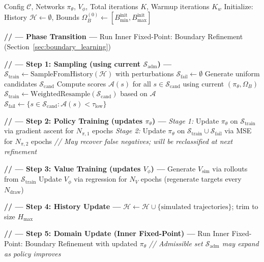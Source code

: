 \begin{algorithm}[H]
\caption{Deep Ramsey Algorithm with Two-Level Fixed-Point Iteration}
\label{alg:main}
\begin{algorithmic}[1]
\Require Config $\mathcal{C}$, Networks $\pi_\theta$, $V_\phi$, Total iterations $K$, Warmup iterations $K_w$
\State Initialize: History $\mathcal{H} \gets \emptyset$, Bounds $\Omega_B^{(0)} \gets [B_{\min}^{\text{init}}, B_{\max}^{\text{init}}]$

 
    \State \textbf{// --- Phase Transition ---}
        \State Run Inner Fixed-Point: Boundary Refinement (Section~\ref{sec:boundary_learning})
    \EndIf
    
    \State
    \State \textbf{// --- Step 1: Sampling (using current $\mathcal{S}_{\text{adm}}$) ---}
     
        \State $\mathcal{S}_{\text{train}} \gets \text{SampleFromHistory}(\mathcal{H})$ with perturbations
        \State $\mathcal{S}_{\text{fail}} \gets \emptyset$
    \Else {}
        \State Generate uniform candidates $\mathcal{S}_{\text{cand}}$
        \State Compute scores $\mathcal{A}(s)$ for all $s \in \mathcal{S}_{\text{cand}}$ using current $(\pi_\theta, \Omega_B)$
        \State $\mathcal{S}_{\text{train}} \gets \text{WeightedResample}(\mathcal{S}_{\text{cand}})$ based on $\mathcal{A}$
        \State $\mathcal{S}_{\text{fail}} \gets \{s \in \mathcal{S}_{\text{cand}} : \mathcal{A}(s) < \tau_{\text{low}}\}$
    \EndIf
    
    \State
    \State \textbf{// --- Step 2: Policy Training (updates $\pi_\theta$) ---}
    \State \textit{Stage 1:} Update $\pi_\theta$ on $\mathcal{S}_{\text{train}}$ via gradient ascent for $N_{\pi,1}$ epochs
        \State \textit{Stage 2:} Update $\pi_\theta$ on $\mathcal{S}_{\text{train}} \cup \mathcal{S}_{\text{fail}}$ via MSE for $N_{\pi,2}$ epochs
        \State \hspace{2em} \textit{// May recover false negatives; will be reclassified at next refinement}
    \EndIf
    
    \State
    \State \textbf{// --- Step 3: Value Training (updates $V_\phi$) ---}
    \State Generate $V_{\text{sim}}$ via rollouts from $\mathcal{S}_{\text{train}}$
    \State Update $V_\phi$ via regression for $N_V$ epochs (regenerate targets every $N_{\text{draw}}$)
    
    \State
    \State \textbf{// --- Step 4: History Update ---}
    \State $\mathcal{H} \gets \mathcal{H} \cup \{\text{simulated trajectories}\}$; trim to size $H_{\max}$
    
    \State
    \State \textbf{// --- Step 5: Domain Update (Inner Fixed-Point) ---}
        \State Run Inner Fixed-Point: Boundary Refinement with updated $\pi_\theta$
        \State \textit{// Admissible set $\mathcal{S}_{\text{adm}}$ may expand as policy improves}
    \EndIf
\EndFor
\end{algorithmic}
\end{algorithm}

